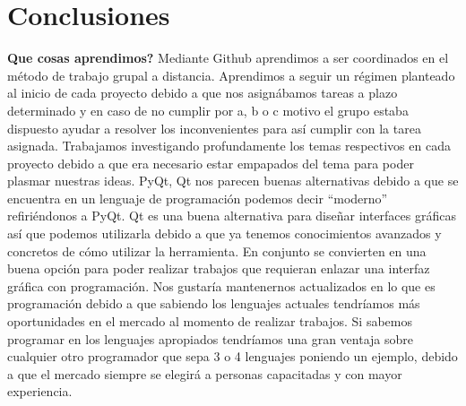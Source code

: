 \documentclass[10pt,oneside]{report}
\begin{document}
\chapter{Conclusiones}
\textsf{{\bf Que cosas aprendimos?} \newline \newline Mediante Github aprendimos a ser coordinados en el método de trabajo grupal a distancia. Aprendimos a seguir un régimen planteado al inicio de cada proyecto debido a que nos asignábamos tareas a plazo determinado y en caso de no cumplir por a, b o c motivo el grupo estaba dispuesto ayudar a resolver los inconvenientes para así cumplir con la tarea asignada. Trabajamos investigando profundamente los temas respectivos en cada proyecto debido a que era necesario estar empapados del tema para poder plasmar nuestras ideas. \newline {} \newline \newline PyQt, Qt nos parecen buenas alternativas debido a que se encuentra en un lenguaje de programación podemos decir “moderno” refiriéndonos a PyQt. Qt es una buena alternativa para diseñar interfaces gráficas así que podemos utilizarla debido a que ya tenemos conocimientos avanzados y concretos de cómo utilizar la herramienta. En conjunto se convierten en una buena opción para poder realizar trabajos que requieran enlazar una interfaz gráfica con programación. \newline {}\newline \newline Nos gustaría mantenernos actualizados en lo que es programación debido a que sabiendo los lenguajes actuales tendríamos más oportunidades en el mercado al momento de realizar trabajos. Si sabemos programar en los lenguajes apropiados tendríamos una gran ventaja sobre cualquier otro programador que sepa 3 o 4 lenguajes poniendo un ejemplo, debido a que el mercado siempre se elegirá a personas capacitadas y con mayor experiencia.}
\end{document}
